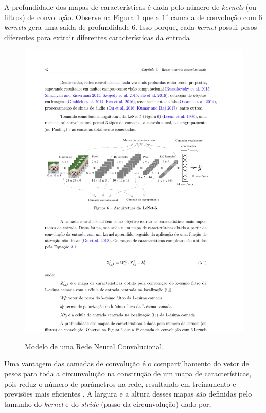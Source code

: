 A profundidade dos mapas de características é dada pelo número de \textit{kernels} (ou filtros) de convolução. Observe na Figura \ref{fig:cnn} que a $1^{\mathrm{a}}$
camada de convolução com 6 \textit{kernels} gera uma saída de profundidade 6. Isso porque, cada \textit{kernel} possui pesos diferentes para extrair diferentes características da entrada \cite{lucas_2019}.
 
 \begin{figure}[!htb]
 	\centering
 	\caption{Modelo de uma Rede Neural Convolucional.}
 	\includegraphics[width=1\linewidth]{Modelos/Figuras/cnn.pdf}
 	\label{fig:cnn}
 \end{figure}
  
Uma vantagem das camadas de convolução é o compartilhamento do vetor de pesos para toda a circunvolução na construção de um mapa de características, pois reduz o número de parâmetros na rede, resultando em treinamento e previsões mais eficientes \cite{lucas_2019}.
A largura e a altura desses mapas são definidas pelo tamanho do \textit{kernel} e do \textit{stride} (passo da circunvolução) dado por,
 

